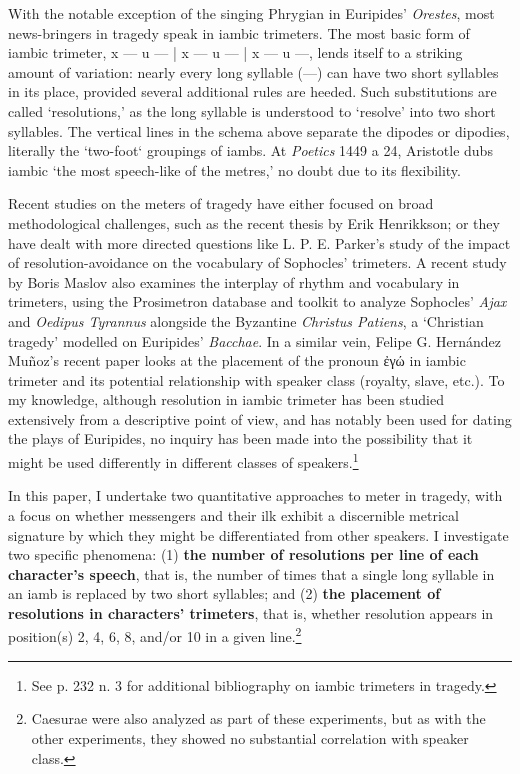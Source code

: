 \documentclass[
]{ceurart}
\begin{document}
With the notable exception of the singing Phrygian in Euripides' \textit
{Orestes}, most news-bringers in tragedy speak in iambic trimeters. The most
basic form of iambic trimeter, x — u — | x — u — | x — u —, lends itself to a
striking amount of variation: nearly every long syllable (—) can have two
short syllables in its place, provided several additional rules are heeded.
Such substitutions are called `resolutions,' as the long syllable is
understood to `resolve' into two short syllables. The vertical lines in the
schema above separate the dipodes or dipodies, literally the `two-foot`
groupings of iambs. At \textit{Poetics} 1449 a 24, Aristotle dubs iambic `the
most speech-like of the metres,' no doubt due to its flexibility.

Recent studies on the meters of tragedy have either focused on broad
methodological challenges, such as the recent thesis by Erik Henrikkson; or
they have dealt with more directed questions like L. P. E. Parker's study of
the impact of resolution-avoidance on the vocabulary of Sophocles'
trimeters.\cite{Henriksson, Parker2022} A recent study by Boris Maslov also
examines the interplay of rhythm and vocabulary in trimeters, using the
Prosimetron database and toolkit to analyze Sophocles' \textit
{Ajax} and \textit{Oedipus Tyrannus} alongside the Byzantine \textit
{Christus Patiens}, a `Christian tragedy' modelled on Euripides' \textit
{Bacchae}.\cite{Maslov2022} In a similar vein, Felipe G. Hernández Muñoz's
recent paper looks at the placement of the pronoun ἐγώ in iambic trimeter and
its potential relationship with speaker class (royalty, slave, etc.).\cite
{HernandezMunoz2019} To my knowledge, although resolution in iambic trimeter
has been studied extensively from a descriptive point of view, and has
notably been used for dating the plays of Euripides, no inquiry has been made
into the possibility that it might be used differently in different classes
of speakers.\footnote{See \cite{Parker2022} p. 232 n. 3 for additional
bibliography on iambic trimeters in tragedy.}

In this paper, I undertake two quantitative approaches to meter in tragedy,
with a focus on whether messengers and their ilk exhibit a discernible
metrical signature by which they might be differentiated from other speakers.
I investigate two specific phenomena: (1) \textbf{the number of resolutions
per line of each character's speech}, that is, the number of times that a
single long syllable in an iamb is replaced by two short syllables; and
(2) \textbf{the placement of resolutions in characters' trimeters}, that is,
whether resolution appears in position(s) 2, 4, 6, 8, and/or 10 in a given
line.\footnote{Caesurae were also analyzed as part of these experiments, but
as with the other experiments, they showed no substantial correlation with
speaker class.}
\end{document}
